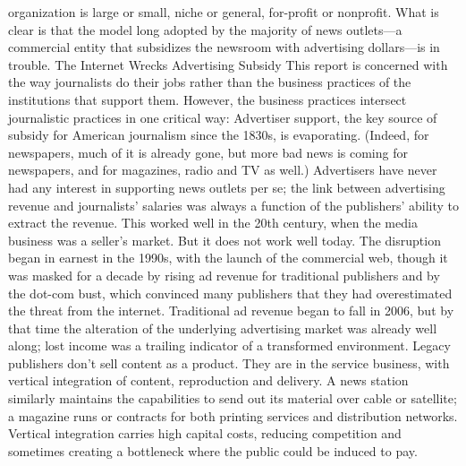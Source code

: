 organization is large or small, niche or general, for-profit or nonprofit. What is
clear is that the model long adopted by the majority of news outlets—a commercial
entity that subsidizes the newsroom with advertising dollars—is in trouble.
The Internet Wrecks Advertising Subsidy
This report is concerned with the way journalists do their jobs rather than the
business practices of the institutions that support them. However, the business
practices intersect journalistic practices in one critical way: Advertiser support,
the key source of subsidy for American journalism since the 1830s, is evaporating.
(Indeed, for newspapers, much of it is already gone, but more bad news is coming
for newspapers, and for magazines, radio and TV as well.)
Advertisers have never had any interest in supporting news outlets per se; the
link between advertising revenue and journalists’ salaries was always a function
of the publishers’ ability to extract the revenue. This worked well in the 20th
century, when the media business was a seller’s market. But it does not work
well today.
The disruption began in earnest in the 1990s, with the launch of the commercial
web, though it was masked for a decade by rising ad revenue for traditional publishers
and by the dot-com bust, which convinced many publishers that they had overestimated
the threat from the internet. Traditional ad revenue began to fall in 2006,
but by that time the alteration of the underlying advertising market was already
well along; lost income was a trailing indicator of a transformed environment.
Legacy publishers don’t sell content as a product. They are in the service business,
with vertical integration of content, reproduction and delivery. A news station
similarly maintains the capabilities to send out its material over cable or satellite; a
magazine runs or contracts for both printing services and distribution networks.
Vertical integration carries high capital costs, reducing competition and sometimes
creating a bottleneck where the public could be induced to pay.

